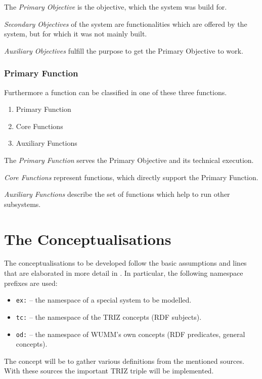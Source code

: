 \documentclass[11pt,a4paper]{article}
\begin{document}
The \emph{Primary Objective} is the objective, which the system was build for.

\emph{Secondary Objectives} of the system are functionalities which are
offered by the system, but for which it was not mainly built.

\emph{Auxiliary Objectives} fulfill the purpose to get the Primary Objective
to work.

\subsubsection{Primary Function}
\label{subsubsec:primary_function}

Furthermore a function can be classified in one of these three functions.
\begin{enumerate}
\item Primary Function
\item Core Functions
\item Auxiliary Functions
\end{enumerate}

The \emph{Primary Function} serves the Primary Objective and its technical
execution.

\emph{Core Functions} represent functions, which directly support the Primary
Function.

\emph{Auxiliary Functions} describe the set of functions which help to run
other subsystems.

\section{The Conceptualisations}
\label{sec:conceptualisations}

The conceptualisations to be developed follow the basic assumptions and lines
that are elaborated in more detail in \cite{Graebe2021}. In particular, the
following namespace prefixes are used:
\begin{itemize}
\item \texttt{ex:} -- the namespace of a special system to be modelled. 
\item \texttt{tc:} -- the namespace of the TRIZ concepts (RDF subjects).
\item \texttt{od:} -- the namespace of WUMM's own concepts (RDF predicates,
  general concepts).
\end{itemize}

The concept will be to gather various definitions from the mentioned sources.
With these sources the important TRIZ triple will be implemented.
\end{document}
